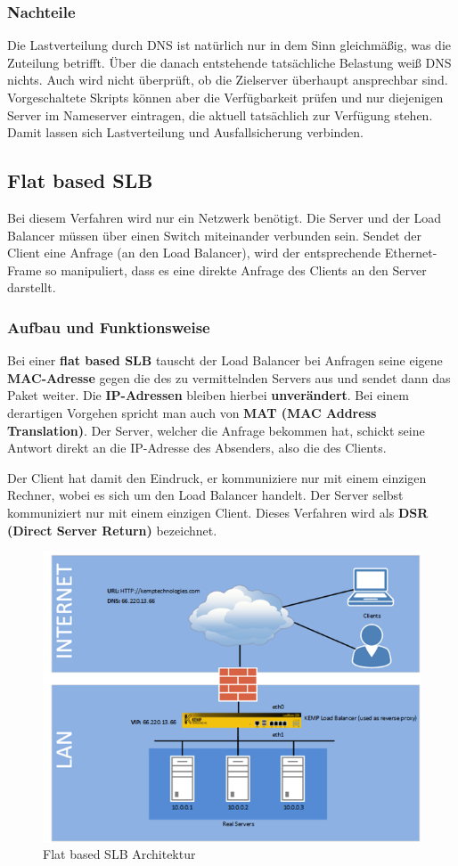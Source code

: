 \subsubsection{Nachteile}
Die Lastverteilung durch DNS ist natürlich nur in dem Sinn gleichmäßig, was die Zuteilung betrifft. Über die danach entstehende tatsächliche Belastung weiß DNS nichts. Auch wird nicht überprüft, ob die Zielserver überhaupt ansprechbar sind. Vorgeschaltete Skripts können aber die Verfügbarkeit prüfen und nur diejenigen Server im Nameserver eintragen, die aktuell tatsächlich zur Verfügung stehen. Damit lassen sich Lastverteilung und Ausfallsicherung verbinden.


\newpage

\subsection{Flat based SLB}
\label{FlatSLB}
Bei diesem Verfahren wird nur ein Netzwerk benötigt. Die Server und der Load Balancer müssen über einen Switch miteinander verbunden sein. Sendet der Client eine Anfrage (an den Load Balancer), wird der entsprechende Ethernet-Frame so manipuliert, dass es eine direkte Anfrage des Clients an den Server darstellt.

\subsubsection{Aufbau und Funktionsweise}
Bei einer \textbf{flat based SLB}  tauscht der Load Balancer bei Anfragen seine eigene \textbf{MAC-Adresse} gegen die des zu vermittelnden Servers aus und sendet dann das Paket weiter. Die \textbf{IP-Adressen} bleiben hierbei \textbf{unverändert}. Bei einem derartigen Vorgehen spricht man auch von \textbf{MAT (MAC Address Translation)}. Der Server, welcher die Anfrage bekommen hat, schickt seine Antwort direkt an die IP-Adresse des Absenders, also die des Clients.

Der Client hat damit den Eindruck, er kommuniziere nur mit einem einzigen Rechner, wobei es sich um den Load Balancer handelt. Der Server selbst kommuniziert nur mit einem einzigen Client. Dieses Verfahren wird als \textbf{DSR (Direct Server Return)} bezeichnet.

\begin{figure}[!h]
	\begin{center}
		\includegraphics[width=0.5\linewidth]{images/flat_slb}
		\caption{Flat based SLB Architektur }
		\label{flat_based_SLB}
	\end{center}
\end{figure}

